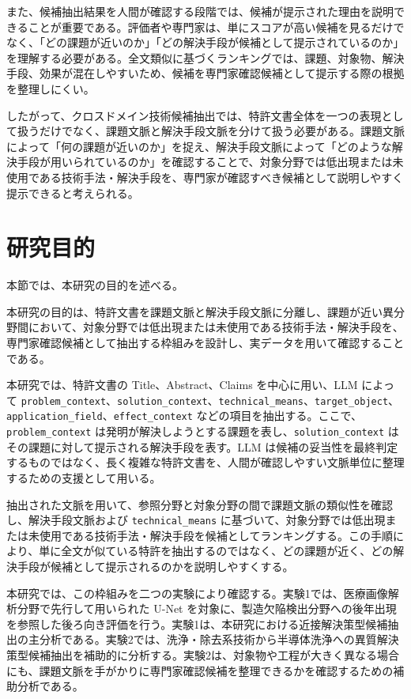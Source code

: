 また、候補抽出結果を人間が確認する段階では、候補が提示された理由を説明できることが重要である。評価者や専門家は、単にスコアが高い候補を見るだけでなく、「どの課題が近いのか」「どの解決手段が候補として提示されているのか」を理解する必要がある。全文類似に基づくランキングでは、課題、対象物、解決手段、効果が混在しやすいため、候補を専門家確認候補として提示する際の根拠を整理しにくい。

したがって、クロスドメイン技術候補抽出では、特許文書全体を一つの表現として扱うだけでなく、課題文脈と解決手段文脈を分けて扱う必要がある。課題文脈によって「何の課題が近いのか」を捉え、解決手段文脈によって「どのような解決手段が用いられているのか」を確認することで、対象分野では低出現または未使用である技術手法・解決手段を、専門家が確認すべき候補として説明しやすく提示できると考えられる。

\section{研究目的}

本節では、本研究の目的を述べる。

本研究の目的は、特許文書を課題文脈と解決手段文脈に分離し、課題が近い異分野間において、対象分野では低出現または未使用である技術手法・解決手段を、専門家確認候補として抽出する枠組みを設計し、実データを用いて確認することである。

本研究では、特許文書の Title、Abstract、Claims を中心に用い、LLM によって \texttt{problem\_context}、\texttt{solution\_context}、\texttt{technical\_means}、\texttt{target\_object}、\texttt{application\_field}、\texttt{effect\_context} などの項目を抽出する。ここで、\texttt{problem\_context} は発明が解決しようとする課題を表し、\texttt{solution\_context} はその課題に対して提示される解決手段を表す。LLM は候補の妥当性を最終判定するものではなく、長く複雑な特許文書を、人間が確認しやすい文脈単位に整理するための支援として用いる。

抽出された文脈を用いて、参照分野と対象分野の間で課題文脈の類似性を確認し、解決手段文脈および \texttt{technical\_means} に基づいて、対象分野では低出現または未使用である技術手法・解決手段を候補としてランキングする。この手順により、単に全文が似ている特許を抽出するのではなく、どの課題が近く、どの解決手段が候補として提示されるのかを説明しやすくする。

本研究では、この枠組みを二つの実験により確認する。実験1では、医療画像解析分野で先行して用いられた U-Net を対象に、製造欠陥検出分野への後年出現を参照した後ろ向き評価を行う。実験1は、本研究における近接解決策型候補抽出の主分析である。実験2では、洗浄・除去系技術から半導体洗浄への異質解決策型候補抽出を補助的に分析する。実験2は、対象物や工程が大きく異なる場合にも、課題文脈を手がかりに専門家確認候補を整理できるかを確認するための補助分析である。

